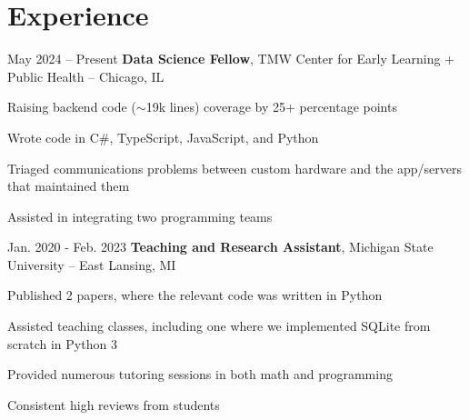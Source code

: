 

	\vspace{0.6 cm}

	\section{Experience}

	\begin{twocolentry}
		{ May 2024 – Present } \textbf{Data Science Fellow}, TMW Center for Early Learning
		+ Public Health -- Chicago, IL
	\end{twocolentry}

	\vspace{0.10 cm}
	\begin{onecolentry}
		\begin{highlights}
			\item Raising backend code ($\sim$19k lines) coverage by 25+ percentage points
			\item Wrote code in C\#, TypeScript, JavaScript, and Python
			\item Triaged communications problems between custom hardware and the app/servers that maintained them
			\item Assisted in integrating two programming teams
		\end{highlights}
	\end{onecolentry}

	\vspace{0.2 cm}

	\begin{twocolentry}
		{ Jan. 2020 - Feb. 2023 } \textbf{Teaching and Research Assistant}, Michigan
		State University -- East Lansing, MI
	\end{twocolentry}

	\vspace{0.10 cm}
	\begin{onecolentry}
		\begin{highlights}
			\item Published 2 papers, where the relevant code was written in Python
			\item Assisted teaching classes, including one where we implemented SQLite from scratch in Python 3
			\item Provided numerous tutoring sessions in both math and programming
			\item Consistent high reviews from students
		\end{highlights}
	\end{onecolentry}

